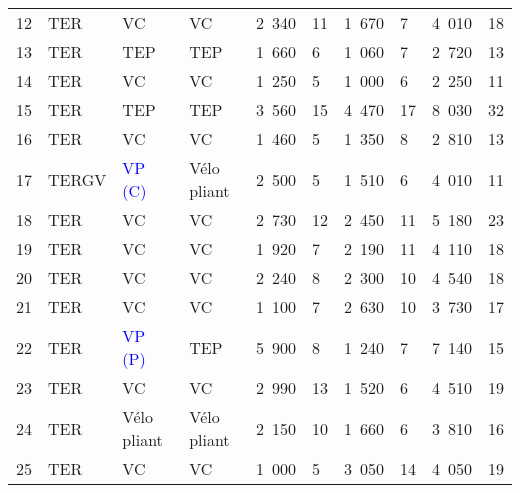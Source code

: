 \begin{longtable}{p{0.7cm}p{1.4cm}p{1.4cm}p{1.6cm}p{0.8cm}p{0.8cm}p{0.8cm}p{0.8cm}p{1.1cm}p{1.1cm}}
    \small{12} & \small{TER} & \small{VC} & \small{VC} & \small{2~340} & \small{11} & \small{1~670} & \small{7} & \small{4~010} & \small{18}\\
    \small{13} & \small{TER} & \small{TEP} & \small{TEP} & \small{1~660} & \small{6} & \small{1~060} & \small{7} & \small{2~720} & \small{13}\\
    \small{14} & \small{TER} & \small{VC} & \small{VC} & \small{1~250} & \small{5} & \small{1~000} & \small{6} & \small{2~250} & \small{11}\\
    \small{15} & \small{TER} & \small{TEP} & \small{TEP} & \small{3~560} & \small{15} & \small{4~470} & \small{17} & \small{8~030} & \small{32}\\
    \small{16} & \small{TER} & \small{VC} & \small{VC} & \small{1~460} & \small{5} & \small{1~350} & \small{8} & \small{2~810} & \small{13}\\
    \small{17} & \small{TERGV} & \small{\textcolor{blue}{VP (C)}} & \small{Vélo pliant} & \small{2~500} & \small{5} & \small{1~510} & \small{6} & \small{4~010} & \small{11}\\
    \small{18} & \small{TER} & \small{VC} & \small{VC} & \small{2~730} & \small{12} & \small{2~450} & \small{11} & \small{5~180} & \small{23}\\
    \small{19} & \small{TER} & \small{VC} & \small{VC} & \small{1~920} & \small{7} & \small{2~190} & \small{11} & \small{4~110} & \small{18}\\
    \small{20} & \small{TER} & \small{VC} & \small{VC} & \small{2~240} & \small{8} & \small{2~300} & \small{10} & \small{4~540} & \small{18}\\
    \small{21} & \small{TER} & \small{VC} & \small{VC} & \small{1~100} & \small{7} & \small{2~630} & \small{10} & \small{3~730} & \small{17}\\
    \small{22} & \small{TER} & \small{\textcolor{blue}{VP (P)}} & \small{TEP} & \small{5~900} & \small{8} & \small{1~240} & \small{7} & \small{7~140} & \small{15}\\
    \small{23} & \small{TER} & \small{VC} & \small{VC} & \small{2~990} & \small{13} & \small{1~520} & \small{6} & \small{4~510} & \small{19}\\
    \small{24} & \small{TER} & \small{Vélo pliant} & \small{Vélo pliant} & \small{2~150} & \small{10} & \small{1~660} & \small{6} & \small{3~810} & \small{16}\\
    \small{25} & \small{TER} & \small{VC} & \small{VC} & \small{1~000} & \small{5} & \small{3~050} & \small{14} & \small{4~050} & \small{19}\\

\end{longtable}
